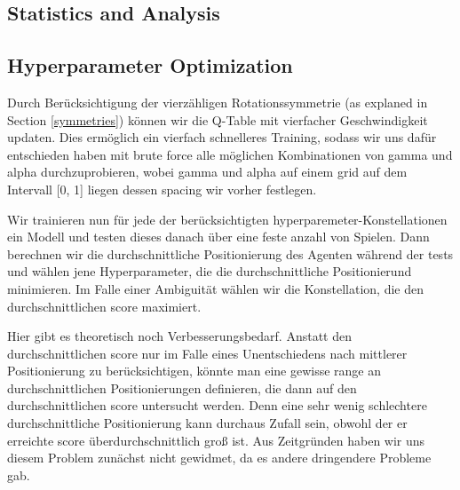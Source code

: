 \subsection{Statistics and Analysis}

\subsection{Hyperparameter Optimization}
Durch Berücksichtigung der vierzähligen Rotationssymmetrie (as explaned in Section \ref{symmetries}) können wir die Q-Table mit vierfacher Geschwindigkeit updaten. Dies ermöglich ein vierfach schnelleres Training, sodass wir uns dafür entschieden haben mit brute force alle möglichen Kombinationen von gamma und alpha durchzuprobieren, wobei gamma und alpha auf einem grid auf dem Intervall [0, 1] liegen dessen spacing wir vorher festlegen.

Wir trainieren nun für jede der berücksichtigten hyperparemeter-Konstellationen ein Modell und testen dieses danach über eine feste anzahl von Spielen. Dann berechnen wir die durchschnittliche Positionierung des Agenten während der tests und wählen jene Hyperparameter, die die durchschnittliche Positionierund minimieren. Im Falle einer Ambiguität wählen wir die Konstellation, die den durchschnittlichen score maximiert.

Hier gibt es theoretisch noch Verbesserungsbedarf. Anstatt den durchschnittlichen score nur im Falle eines Unentschiedens nach mittlerer Positionierung zu berücksichtigen, könnte man eine gewisse range an durchschnittlichen Positionierungen definieren, die dann auf den durchschnittlichen score untersucht werden. Denn eine sehr wenig schlechtere durchschnittliche Positionierung kann durchaus Zufall sein, obwohl der er erreichte score überdurchschnittlich groß ist. Aus Zeitgründen haben wir uns diesem Problem zunächst nicht gewidmet, da es andere dringendere Probleme gab.

